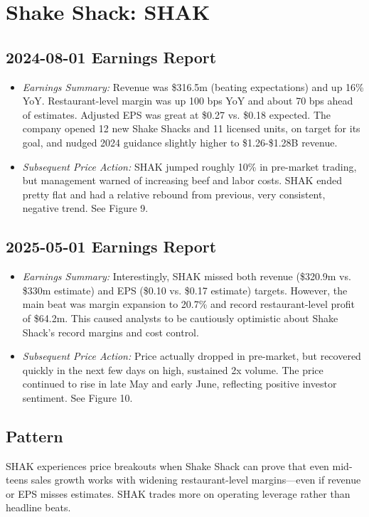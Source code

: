 \documentclass[11pt]{article}
\begin{document}
\section{Shake Shack: SHAK}
    \subsection{2024-08-01 Earnings Report}
        \begin{itemize}
            \item \textit{Earnings Summary:} Revenue was \$316.5m (beating expectations) and up 16\% YoY. Restaurant-level margin was up 100 bps YoY and about 70 bps ahead of estimates. Adjusted EPS was great at \$0.27 vs. \$0.18 expected. The company opened 12 new Shake Shacks and 11 licensed units, on target for its goal, and nudged 2024 guidance slightly higher to \$1.26-\$1.28B revenue.
            \item \textit{Subsequent Price Action:} SHAK jumped roughly 10\% in pre-market trading, but management warned of increasing beef and labor costs. SHAK ended pretty flat and had a relative rebound from previous, very consistent, negative trend. See Figure 9.
        \end{itemize}
    \subsection{2025-05-01 Earnings Report}
        \begin{itemize}
            \item \textit{Earnings Summary:} Interestingly, SHAK missed both revenue (\$320.9m vs. \$330m estimate) and EPS (\$0.10 vs. \$0.17 estimate) targets. However, the main beat was margin expansion to 20.7\% and record restaurant-level profit of \$64.2m. This caused analysts to be cautiously optimistic about Shake Shack's record margins and cost control. 
            \item \textit{Subsequent Price Action:} Price actually dropped in pre-market, but recovered quickly in the next few days on high, sustained 2x volume. The price continued to rise in late May and early June, reflecting positive investor sentiment. See Figure 10.
        \end{itemize}
    \subsection{Pattern}
        SHAK experiences price breakouts when Shake Shack can prove that even mid-teens sales growth works with widening restaurant-level margins---even if revenue or EPS misses estimates. SHAK trades more on operating leverage rather than headline beats.
\end{document}

